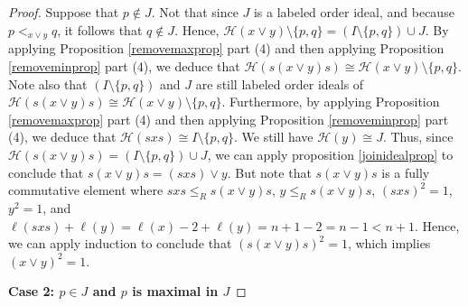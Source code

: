 \documentclass{amsart}
\theoremstyle{plain} %
\theoremstyle{definition}
\def\weakr{\leq_{R}}
\def\H#1{\mathcal{H}(#1)}
\begin{document}
\begin{proof}
    
    Suppose that $ p \notin J$. Not that since $J$ is a labeled order ideal, and because $ p <_{x\vee y} q$, it follows that $ q\notin J$. Hence, $ \H{x\vee y} \setminus \{ p,q \} = (I \setminus \{  p,q \} ) \cup J$. By applying Proposition \ref{removemaxprop} part (4) and then applying Proposition \ref{removeminprop} part (4), we deduce that $ \H{s(x\vee y)s} \cong \H{x\vee y} \setminus \{ p,q \} $. Note also that $ (I \setminus \{  p,q \} )$ and $J$ are still labeled order ideals of $\H{s(x\vee y)s} \cong \H{x\vee y} \setminus \{ p,q \} $. Furthermore, by applying Proposition \ref{removemaxprop} part (4) and then applying Proposition \ref{removeminprop} part (4), we deduce that $ \H{sxs} \cong I \setminus \{ p,q \}$. We still have $ \H{y} \cong J$. Thus, since $ \H{s(x\vee y )s} = (I \setminus \{  p,q \} ) \cup J$, we can apply proposition \ref{joinidealprop} to conclude that $ s(x\vee y)s = (sxs)\vee y$. But note that $ s(x\vee y)s$ is a fully commutative element where $ sxs \weakr s(x\vee y)s$, $ y \weakr s(x\vee y)s$, $ (sxs)^{2}=1$, $ y^{2}=1$, and $ \ell(sxs) + \ell(y) = \ell(x) -2 +\ell(y) =n+1 - 2 = n-1< n+1$. Hence, we can apply induction to conclude that $ (s(x\vee y)s)^{2} = 1$, which implies $ (x\vee y)^{2} = 1$. 

    \textbf{Case 2: $ p \in J$ and $ p$ is maximal in $J$}


\end{proof}
\end{document}
